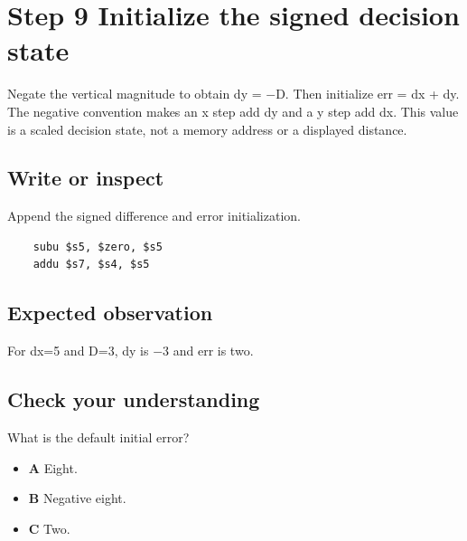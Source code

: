 \section{Step 9 Initialize the signed decision
  state}\label{007-bresenham-line-s09-step-9-initialize-the-signed-decision-state}

Negate the vertical magnitude to obtain dy = \ensuremath{-}D. Then initialize err =
dx + dy. The negative convention makes an x step add dy and a y step add
dx. This value is a scaled decision state, not a memory address or a
displayed distance.

\subsection{Write or
  inspect}\label{007-bresenham-line-s09-write-or-inspect}

Append the signed difference and error initialization.

\begin{verbatim}
    subu $s5, $zero, $s5
    addu $s7, $s4, $s5
\end{verbatim}

\subsection{Expected
  observation}\label{007-bresenham-line-s09-expected-observation}

For dx=5 and D=3, dy is \ensuremath{-}3 and err is two.

\subsection{Check your
  understanding}\label{007-bresenham-line-s09-check-your-understanding}

What is the default initial error?

\begin{itemize}
  \tightlist
  \item
        \textbf{A} Eight.
  \item
        \textbf{B} Negative eight.
  \item
        \textbf{C} Two.
\end{itemize}
